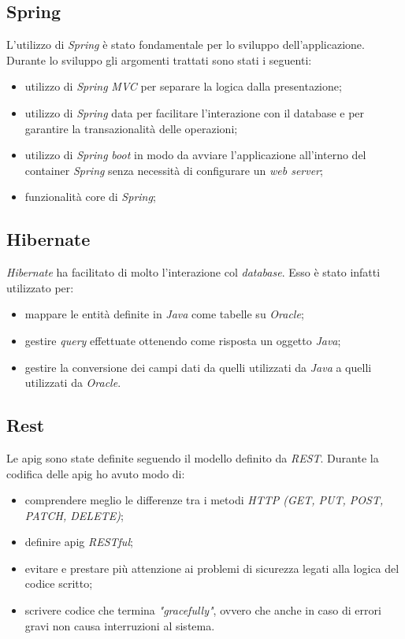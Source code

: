 \subsection{Spring}
L'utilizzo di \textit{Spring} è stato fondamentale per lo sviluppo dell'applicazione. Durante lo sviluppo gli argomenti trattati sono stati i seguenti:
\begin{itemize}
    \item utilizzo di \textit{Spring} \textit{MVC} per separare la logica dalla presentazione;
    \item utilizzo di \textit{Spring} data per facilitare l'interazione con il database e per garantire la transazionalità delle operazioni;
    \item utilizzo di \textit{Spring} \textit{boot} in modo da avviare l'applicazione all'interno del container \textit{Spring} senza necessità di configurare un \textit{web server};
    \item funzionalità core di \textit{Spring};
\end{itemize}

\subsection{Hibernate}
\textit{Hibernate} ha facilitato di molto l'interazione col \textit{database}. Esso è stato infatti utilizzato per:
\begin{itemize}
    \item mappare le entità definite in \textit{Java} come tabelle su \textit{Oracle};
    \item gestire \textit{query} effettuate ottenendo come risposta un oggetto \textit{Java};
    \item gestire la conversione dei campi dati da quelli utilizzati da \textit{Java} a quelli utilizzati da \textit{Oracle}.
\end{itemize}

\subsection{Rest}
Le \gls{apig} sono state definite seguendo il modello definito da \textit{REST}.
Durante la codifica delle \gls{apig} ho avuto modo di:
\begin{itemize}
    \item comprendere meglio le differenze tra i metodi \textit{HTTP (GET, PUT, POST, PATCH, DELETE)};
    \item definire \gls{apig} \textit{RESTful};
    \item evitare e prestare più attenzione ai problemi di sicurezza legati alla logica del codice scritto;
    \item scrivere codice che termina \textit{"gracefully"}, ovvero che anche in caso di errori gravi non causa interruzioni al sistema.
\end{itemize}

